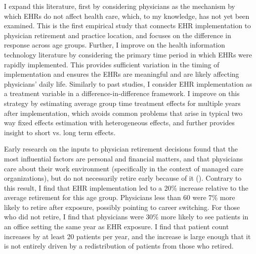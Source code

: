 \documentclass[12pt]{article}
\begin{document}
I expand this literature, first by considering physicians as the mechanism by which EHRs do not affect health care, which, to my knowledge, has not yet been examined. This is the first empirical study that connects EHR implementation to physician retirement and practice location, and focuses on the difference in response across age groups. Further, I improve on the health information technology literature by considering the primary time period in which EHRs were rapidly implemented. This provides sufficient variation in the timing of implementation and ensures the EHRs are meaningful and are likely affecting physicians' daily life. Similarly to past studies, I consider EHR implementation as a treatment variable in a difference-in-difference framework. I improve on this strategy by estimating average group time treatment effects for multiple years after implementation, which avoids common problems that arise in typical two way fixed effects estimation with heterogeneous effects, and further provides insight to short vs. long term effects.  

Early research on the inputs to physician retirement decisions found that the most influential factors are personal and financial matters, and that physicians care about their work environment (specifically in the context of managed care organizations), but do not necessarily retire early because of it (\cite{Bahrami2002}). Contrary to this result, I find that EHR implementation led to a 20\% increase relative to the average retirement for this age group. Physicians less than 60 were 7\% more likely to retire after exposure, possibly pointing to career switching. For those who did not retire, I find that physicians were 30\% more likely to see patients in an office setting the same year as EHR exposure. I find that patient count increases by at least 20 patients per year, and the increase is large enough that it is not entirely driven by a redistribution of patients from those who retired. 
\end{document}
